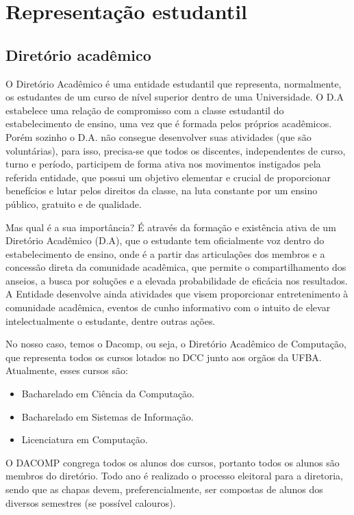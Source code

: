 \chapter{Representação estudantil}
\DoPToC

\section{Diretório acadêmico}

O Diretório Acadêmico é uma entidade estudantil que representa, normalmente, os estudantes de um curso de nível superior dentro de uma Universidade. O D.A estabelece uma relação de compromisso com a classe estudantil do estabelecimento de ensino, uma vez que é formada pelos próprios acadêmicos. Porém sozinho o D.A. não consegue desenvolver suas atividades (que são voluntárias), para isso, precisa-se que todos os discentes, independentes de curso, turno e período, participem de forma ativa nos movimentos instigados pela referida entidade, que possui um objetivo elementar e crucial de proporcionar benefícios e lutar pelos direitos da classe, na luta constante por um ensino público, gratuito e de qualidade.

	Mas qual é a sua importância? É através da formação e existência ativa de um Diretório Acadêmico (D.A), que o estudante tem oficialmente voz dentro do estabelecimento de ensino, onde é a partir das articulações dos membros e a concessão direta da comunidade acadêmica, que permite o compartilhamento dos anseios, a busca por soluções e a elevada probabilidade de eficácia nos resultados. A Entidade desenvolve ainda atividades que visem proporcionar entretenimento à comunidade acadêmica, eventos de cunho informativo com o intuito de elevar intelectualmente o estudante, dentre outras ações.

	No nosso caso, temos o Dacomp, ou seja, o Diretório Acadêmico de Computação, que representa todos os cursos lotados no DCC junto aos orgãos da UFBA. Atualmente, esses cursos são:
  \begin{itemize}
 \item Bacharelado em Ciência da Computação.
 \item Bacharelado em Sistemas de Informação.
 \item Licenciatura em Computação.
 \end{itemize}

	O DACOMP congrega todos os alunos dos cursos, portanto todos os alunos são membros do diretório.
Todo ano é realizado o processo eleitoral para a diretoria, sendo que as chapas devem, preferencialmente, ser compostas de alunos dos diversos semestres (se possível calouros). 
\\

